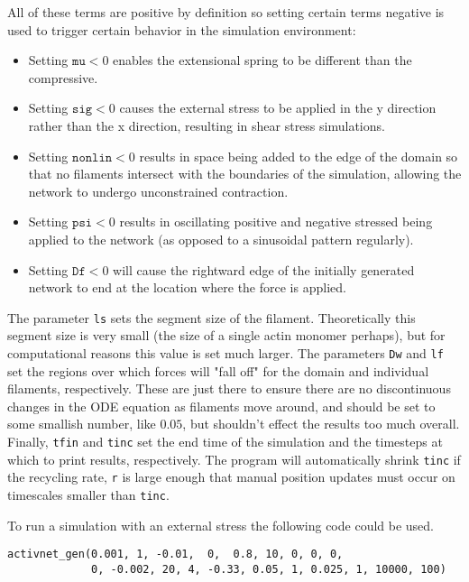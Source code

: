 All of these terms are positive by definition so setting certain terms negative is used to trigger certain behavior in the simulation environment:
\begin{itemize}
	\item  Setting $\texttt{mu} < 0$ enables the extensional spring to be different than the compressive.
	\item  Setting $\texttt{sig} < 0$ causes the external stress to be applied in the y direction rather than the x direction, resulting in shear stress simulations.
	\item Setting $\texttt{nonlin} < 0$ results in space being added to the edge of the domain so that no filaments intersect with the boundaries of the simulation, allowing the network to undergo unconstrained contraction.
	\item Setting $\texttt{psi} < 0$ results in oscillating positive and negative stressed being applied to the network (as opposed to a sinusoidal pattern regularly).
	\item Setting $\texttt{Df} < 0$ will cause the rightward edge of the initially generated network to end at the location where the force is applied.
\end{itemize}
   
The parameter \texttt{ls} sets the segment size of the filament.  Theoretically this segment size is very small (the size of a single actin monomer perhaps), but for computational reasons this value is set much larger.  The parameters \texttt{Dw} and \texttt{lf} set the regions over which forces will "fall off" for the domain and individual filaments, respectively.  These are just there to ensure there are no discontinuous changes in the ODE equation as filaments move around, and should be set to some smallish number, like $0.05$, but shouldn't effect the results too much overall.  Finally, \texttt{tfin} and \texttt{tinc} set the end time of the simulation and the timesteps at which to print results, respectively.  The program will automatically shrink \texttt{tinc} if the recycling rate, \texttt{r} is large enough that manual position updates must occur on timescales smaller than \texttt{tinc}.


To run a simulation with an external stress the following code could be used.

\begin{verbatim}
activnet_gen(0.001, 1, -0.01,  0,  0.8, 10, 0, 0, 0, 
             0, -0.002, 20, 4, -0.33, 0.05, 1, 0.025, 1, 10000, 100)
\end{verbatim}


